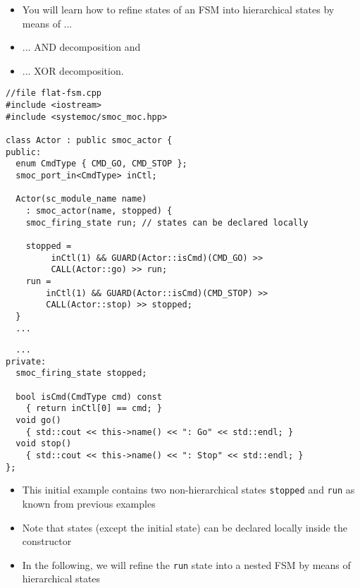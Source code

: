 \begin{frame}
\begin{itemize}
\item You will learn how to refine states of an FSM into hierarchical states by means of ...
\item ... AND decomposition and
\item ... XOR decomposition.
\end{itemize}
\end{frame}


\begin{frame}[fragile=singleslide]
\begin{lstlisting}
//file flat-fsm.cpp
#include <iostream>
#include <systemoc/smoc_moc.hpp>

class Actor : public smoc_actor {
public:
  enum CmdType { CMD_GO, CMD_STOP };
  smoc_port_in<CmdType> inCtl;

  Actor(sc_module_name name)
    : smoc_actor(name, stopped) {
    smoc_firing_state run; // states can be declared locally

    stopped =
         inCtl(1) && GUARD(Actor::isCmd)(CMD_GO) >>
         CALL(Actor::go) >> run;
    run =
        inCtl(1) && GUARD(Actor::isCmd)(CMD_STOP) >>
        CALL(Actor::stop) >> stopped;
  }
  ...
\end{lstlisting}
\end{frame}

\begin{frame}[fragile=singleslide]
\begin{lstlisting}
  ...
private:
  smoc_firing_state stopped;

  bool isCmd(CmdType cmd) const
    { return inCtl[0] == cmd; }
  void go()
    { std::cout << this->name() << ": Go" << std::endl; }
  void stop()
    { std::cout << this->name() << ": Stop" << std::endl; }
};
\end{lstlisting}
\begin{itemize}
\item This initial example contains two non-hierarchical states \texttt{stopped} and \texttt{run} as known from previous examples
\item Note that states (except the initial state) can be declared locally inside the constructor
\item In the following, we will refine the \texttt{run} state into a nested FSM by means of hierarchical states
\end{itemize}
\end{frame}


